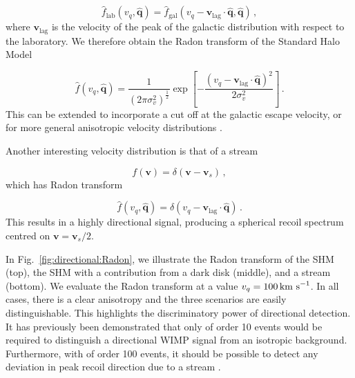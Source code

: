 \begin{equation}
\hat{f}_\textrm{lab}(v_q, \hat{\textbf{q}}) = \hat{f}_\textrm{gal}(v_q - \textbf{v}_\textrm{lag}\cdot\hat{\textbf{q}} , \hat{\textbf{q}})\,,
\end{equation}
where $\textbf{v}_\textrm{lag}$ is the velocity of the peak of the galactic distribution with respect to the laboratory. We therefore obtain the Radon transform of the Standard Halo Model

\begin{equation}
\label{eq:directional:SHM}
\hat{f}(v_q,\hat{\textbf{q}}) =  \frac{1}{(2\pi \sigma_v^2)^{\frac{1}{2}}} \exp \left[ -\frac{(v_q - \textbf{v}_\textrm{lag}\cdot\hat{\textbf{q}})^2}{2 \sigma_v^2}\right]\,.
\end{equation}
This can be extended to incorporate a cut off at the galactic escape velocity, or for more general anisotropic velocity distributions \cite{Gondolo:2002}.

Another interesting velocity distribution is that of a stream

\begin{equation}
f(\textbf{v}) = \delta(\textbf{v} - \textbf{v}_s)\,,
\end{equation}
which has Radon transform

\begin{equation}
\hat{f}(v_q,\hat{\textbf{q}}) =  \delta(v_q - \textbf{v}_\textrm{lag}\cdot\hat{\textbf{q}})\,.
\end{equation}
This results in a highly directional signal, producing a spherical recoil spectrum centred on $\textbf{v} = \textbf{v}_s/2$.

In Fig.~\ref{fig:directional:Radon}, we illustrate the Radon transform of the SHM (top), the SHM with a contribution from a dark disk (middle), and a stream (bottom). We evaluate the Radon transform at a value $v_q = 100 \,\textrm{km s}^{-1}$. In all cases, there is a clear anisotropy and the three scenarios are easily distinguishable. This highlights the discriminatory power of directional detection. It has previously been demonstrated that only of order 10 events would be required to distinguish a directional WIMP signal from an isotropic background. Furthermore, with of order 100 events, it should be possible to detect any deviation in peak recoil direction due to a stream \cite{Morgan:2005}.

